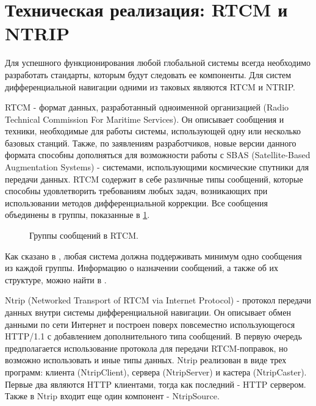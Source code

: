 \documentclass[a4paper,12pt]{report}
\begin{document}
\section{Техническая реализация: RTCM и NTRIP}
\par Для успешного функционирования любой глобальной системы всегда необходимо разработать стандарты, которым будут следовать ее компоненты.
Для систем дифференциальной навигации одними из таковых являются RTCM и NTRIP. \par
RTCM - формат данных, разработанный одноименной организацией (Radio Technical Commission For Maritime Services). Он описывает сообщения и 
техники, необходимые для работы системы, использующей одну или несколько базовых станций. Также, по заявлениям разработчиков, новые версии 
данного формата способны дополняться для возможности работы с SBAS (Satellite-Based Augmentation Systems) - системами, использующими 
космические спутники для передачи данных. RTCM содержит в себе различные типы сообщений, которые способны удовлетворить требованиям любых 
задач, возникающих при использовании методов дифференциальной коррекции. Все сообщения объединены в группы, показанные в \ref{rtcm_groups}. \\

\begin{figure}[h]
\caption{Группы сообщений в RTCM.}
\label{rtcm_groups}
\end{figure}

Как сказано в \cite{rtcm}, любая система должна поддерживать минимум одно сообщения из каждой группы. Информацию о назначении сообщений, а 
также об их структуре, можно найти в \cite{rtcm}. \par
Ntrip (Networked Transport of RTCM via Internet Protocol) - протокол передачи данных внутри системы дифференциальной навигации. Он описывает 
обмен данными по сети Интернет и построен поверх повсеместно использующегося HTTP/1.1 с добавлением дополнительного типа сообщений. В первую 
очередь предполагается использование протокола для передачи RTCM-поправок, но возможно использовать и иные типы данных. Ntrip реализован в 
виде трех программ: клиента (NtripClient), сервера (NtripServer) и кастера (NtripCaster). Первые два являются HTTP клиентами, тогда как 
последний  - HTTP сервером. Также в Ntrip входит еще один компонент - NtripSource. \\
\end{document}
